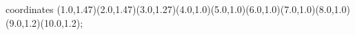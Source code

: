 					coordinates { (1.0,1.47)(2.0,1.47)(3.0,1.27)(4.0,1.0)(5.0,1.0)(6.0,1.0)(7.0,1.0)(8.0,1.0)(9.0,1.2)(10.0,1.2)};